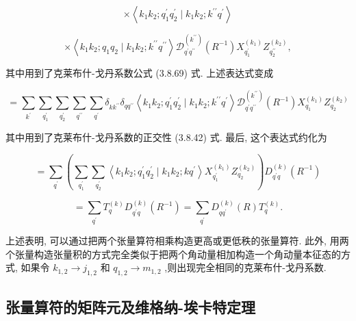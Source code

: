 $$
\times \left\langle {{k}_{1}{k}_{2};{q}_{1}^{\prime }{q}_{2}^{\prime } \mid {k}_{1}{k}_{2};{k}^{\prime \prime }{q}^{\prime }}\right\rangle
$$

$$
\times \left\langle {{k}_{1}{k}_{2};{q}_{1}{q}_{2} \mid {k}_{1}{k}_{2};{k}^{\prime \prime }{q}^{\prime \prime }}\right\rangle {\mathcal{D}}_{{q}^{\prime }{q}^{\prime \prime }}^{\left( {k}^{\prime \prime }\right) }\left( {R}^{-1}\right) {X}_{{q}_{1}^{\prime }}^{\left( {k}_{1}\right) }{Z}_{{q}_{2}^{\prime \prime }}^{\left( {k}_{2}\right) },
$$

其中用到了克莱布什-戈丹系数公式 (3.8.69) 式. 上述表达式变成

$$
= \mathop{\sum }\limits_{{k}^{\prime }}\mathop{\sum }\limits_{{q}_{1}^{\prime }}\mathop{\sum }\limits_{{q}_{2}^{\prime }}\mathop{\sum }\limits_{{q}^{\prime \prime }}\mathop{\sum }\limits_{{q}^{\prime }}{\delta }_{k{k}^{\prime \prime }}{\delta }_{q{q}^{\prime \prime }}\left\langle {{k}_{1}{k}_{2};{q}_{1}^{\prime }{q}_{2}^{\prime } \mid {k}_{1}{k}_{2};{k}^{\prime \prime }{q}^{\prime }}\right\rangle {\mathcal{D}}_{{q}^{\prime }{q}^{\prime \prime }}^{\left( {k}^{\prime \prime }\right) }\left( {R}^{-1}\right) {X}_{{q}_{1}}^{\left( {k}_{1}\right) }{Z}_{{q}_{2}}^{\left( {k}_{2}\right) }
$$

其中用到了克莱布什-戈丹系数的正交性 (3.8.42) 式. 最后, 这个表达式约化为

$$
= \mathop{\sum }\limits_{{q}^{\prime }}\left( {\mathop{\sum }\limits_{{q}_{1}^{\prime }}\mathop{\sum }\limits_{{q}_{2}^{\prime }}\left\langle {{k}_{1}{k}_{2};{q}_{1}^{\prime }{q}_{2}^{\prime } \mid {k}_{1}{k}_{2};k{q}^{\prime }}\right\rangle {X}_{{q}_{1}^{\prime }}^{\left( {k}_{1}\right) }{Z}_{{q}_{2}}^{\left( {k}_{2}\right) }}\right) {D}_{{q}^{\prime }q}^{\left( k\right) }\left( {R}^{-1}\right)
$$

$$
= \mathop{\sum }\limits_{{q}^{\prime }}{T}_{q}^{\left( k\right) }{D}_{{q}^{\prime }q}^{\left( k\right) }\left( {R}^{-1}\right) = \mathop{\sum }\limits_{{q}^{\prime }}{D}_{q{q}^{\prime }}^{\left( k\right) }\left( R\right) {T}_{q}^{\left( k\right) }.
$$

上述表明, 可以通过把两个张量算符相乘构造更高或更低秩的张量算符. 此外, 用两个张量构造张量积的方式完全类似于把两个角动量相加构造一个角动量本征态的方式, 如果令 ${k}_{1,2} \rightarrow {j}_{1,2}$ 和 ${q}_{1,2} \rightarrow {m}_{1,2}$ ,则出现完全相同的克莱布什-戈丹系数.

\subsection{张量算符的矩阵元及维格纳-埃卡特定理}

